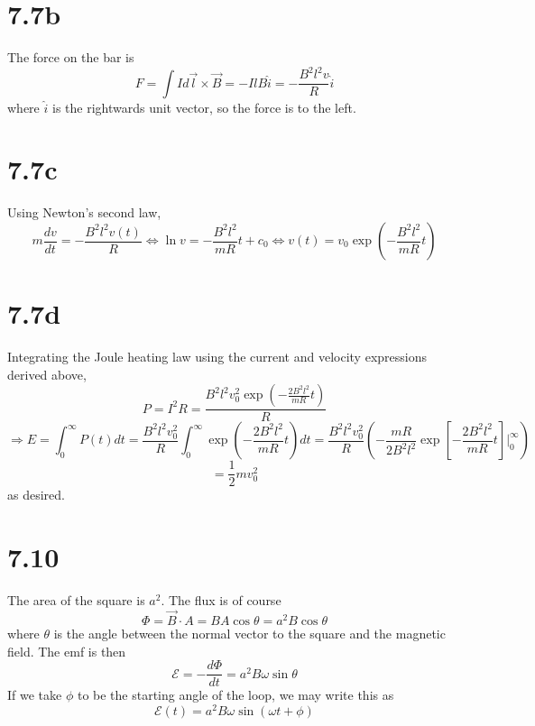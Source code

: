 \documentclass{article}
\begin{document}
\section*{7.7b}
The force on the bar is
\[F=\int Id\vec{l}\times \vec{B}=-IlB\hat{i}=-\frac{B^2l^2v}{R}\hat{i}\]
where $\hat{i}$ is the rightwards unit vector, so the force is to the left.

\section*{7.7c}
Using Newton's second law,
\[m\frac{dv}{dt}=-\frac{B^2l^2v(t)}{R}\Leftrightarrow \ln v= -\frac{B^2l^2}{mR}t+c_0\Leftrightarrow v(t)=v_0\exp\left(  -\frac{B^2l^2}{mR}t\right)\]

\section*{7.7d}
Integrating the Joule heating law using the current and velocity expressions derived above,
\[P=I^2R=\frac{B^2l^2v_0^2\exp\left( -\frac{2B^2l^2}{mR}t \right)}{R}\]
\[\Rightarrow E=\int_0^\infty P(t)dt=\frac{B^2l^2v_0^2}{R}\int_0^\infty\exp\left( -\frac{2B^2l^2}{mR}t \right)dt=\frac{B^2l^2v_0^2}{R}\left( -\frac{mR}{2B^2l^2}\exp\left[ -\frac{2B^2l^2}{mR}t \right]\bigg|_0^\infty \right)\]
\[=\frac{1}{2}mv_0^2\]
as desired.

\section*{7.10}
The area of the square is $a^2$. The flux is of course
\[\Phi=\vec{B}\cdot{A}=BA\cos\theta=a^2B\cos\theta\]
where $\theta$ is the angle between the normal vector to the square and the magnetic field. The emf is then
\[\mathcal{E}=-\frac{d\Phi}{dt}=a^2B\omega\sin\theta\]
If we take $\phi$ to be the starting angle of the loop, we may write this as
\[\mathcal{E}(t)=a^2B\omega\sin(\omega t+\phi)\]
\end{document}
